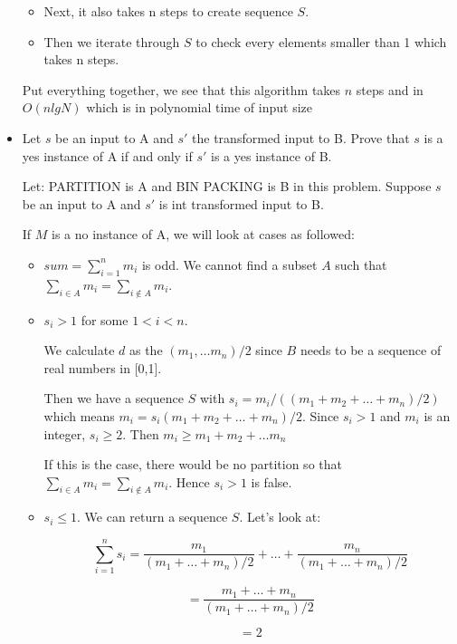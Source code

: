 \documentclass{cpsc413Solutions}
\begin{document}
\begin{problemlist}
\begin{problem}
\begin{answer}
\begin{itemize}
\begin{itemize}
        \item Next, it also takes n steps to create sequence $S$.
        
        \item Then we iterate through $S$ to check every elements smaller than 1 which takes n steps.
        
    \end{itemize}
     
     Put everything together, we see that this algorithm takes $n$ steps and in $O(nlgN)$ which is in polynomial time of input size
     
    \item Let $s$ be an input to A and $s'$ the transformed input to B. Prove that $s$ is a yes instance of A if and only if $s'$ is a yes instance of B.
    
    Let: PARTITION is A and BIN PACKING is B in this problem.
    Suppose $s$ be an input to A and $s'$ is int transformed input to B.
    
    If $M$ is a no instance of A, we will look at cases as followed:
    \begin{itemize}
        \item $sum = \sum^n_{i=1} m_i$ is odd. We cannot find a subset $A$ such that $\sum_{i \in A} m_i = \sum_{i \notin A} m_i$.
        
        \item $s_i >1$ for some $1 <i <n$.
        
        We calculate $d$ as the $(m_1, \dots m_n)/2$ since $B$ needs to be a sequence of real numbers in [0,1].
        
        Then we have a sequence $S$ with $s_i = m_i / ((m_1 + m_2 + \dots + m_n)/2)$ which means $m_i = s_i(m_1+m_2+\dots+m_n)/2$. Since $s_i > 1$ and $m_i$ is an integer, $s_i \geq 2$. Then $m_i \geq m_1 + m_2 + \dots m_n$
        
        If this is the case, there would be no partition so that $\sum_{i\in A}m_i = \sum_{i \notin A} m_i$. Hence $s_i > 1$ is false.
        
        \item $s_i \leq 1$. We can return a sequence $S$. Let's look at:
        
        $$\sum^n_{i=1} s_i = \frac{m_1}{(m_1+\dots+m_n)/2}+\dots + \frac{m_n}{(m_1+\dots+m_n)/2}$$
        
        $$= \frac{m_ 1+ \dots + m_n}{(m_1+\dots+m_n)/2}$$
        
        $$=2$$
        

\end{itemize}
\end{itemize}
\end{answer}
\end{problem}
\end{problemlist}
\end{document}
